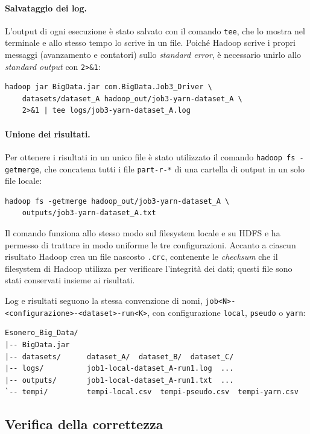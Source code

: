 \documentclass[12pt, a4paper]{article}
\begin{document}
\paragraph{Salvataggio dei log.}
L'output di ogni esecuzione è stato salvato con il comando
\texttt{tee}, che lo mostra nel terminale e allo stesso tempo
lo scrive in un file. Poiché Hadoop scrive i propri messaggi
(avanzamento e contatori) sullo \textit{standard error},
è necessario unirlo allo \textit{standard output}
con \texttt{2>\&1}:

\begin{verbatim}
hadoop jar BigData.jar com.BigData.Job3_Driver \
    datasets/dataset_A hadoop_out/job3-yarn-dataset_A \
    2>&1 | tee logs/job3-yarn-dataset_A.log
\end{verbatim}

\paragraph{Unione dei risultati.}
Per ottenere i risultati in un unico file è stato utilizzato
il comando \texttt{hadoop fs -getmerge}, che concatena
tutti i file \texttt{part-r-*} di una cartella di output
in un solo file locale:

\begin{verbatim}
hadoop fs -getmerge hadoop_out/job3-yarn-dataset_A \
    outputs/job3-yarn-dataset_A.txt
\end{verbatim}

Il comando funziona allo stesso modo sul filesystem locale
e su HDFS e ha permesso di trattare in modo uniforme
le tre configurazioni.
Accanto a ciascun risultato Hadoop crea un file nascosto
\texttt{.crc}, contenente le \textit{checksum} che il
filesystem di Hadoop utilizza per verificare l'integrità
dei dati; questi file sono stati conservati insieme
ai risultati.

Log e risultati seguono la stessa convenzione di nomi,
\texttt{job<N>-\allowbreak<configurazione>-\allowbreak<dataset>-\allowbreak run<K>},
con configurazione \texttt{local}, \texttt{pseudo} o \texttt{yarn}:

\begin{verbatim}
Esonero_Big_Data/
|-- BigData.jar
|-- datasets/      dataset_A/  dataset_B/  dataset_C/
|-- logs/          job1-local-dataset_A-run1.log  ...
|-- outputs/       job1-local-dataset_A-run1.txt  ...
`-- tempi/         tempi-local.csv  tempi-pseudo.csv  tempi-yarn.csv
\end{verbatim}

\subsection{Verifica della correttezza}
\end{document}
